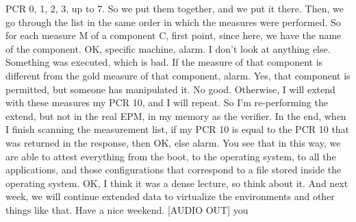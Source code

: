  PCR 0, 1, 2, 3, up to 7. So we put them together, and we put it there. Then,
 we go through the list in the same order in which the measures were performed.
 So for each measure M of a component C, first point, since here, we have the
 name of the component. OK, specific machine, alarm. I don't look at anything
 else. Something was executed, which is bad. If the measure of that component
 is different from the gold measure of that component, alarm. Yes, that
 component is permitted, but someone has manipulated it. No good. Otherwise, I
 will extend with these measures my PCR 10, and I will repeat. So I'm
 re-performing the extend, but not in the real EPM, in my memory as the
 verifier. In the end, when I finish scanning the measurement list, if my PCR
 10 is equal to the PCR 10 that was returned in the response, then OK, else
 alarm. You see that in this way, we are able to attest everything from the
 boot, to the operating system, to all the applications, and those
 configurations that correspond to a file stored inside the operating system.
 OK, I think it was a dense lecture, so think about it. And next week, we will
 continue extended data to virtualize the environments and other things like
 that. Have a nice weekend. [AUDIO OUT] you
